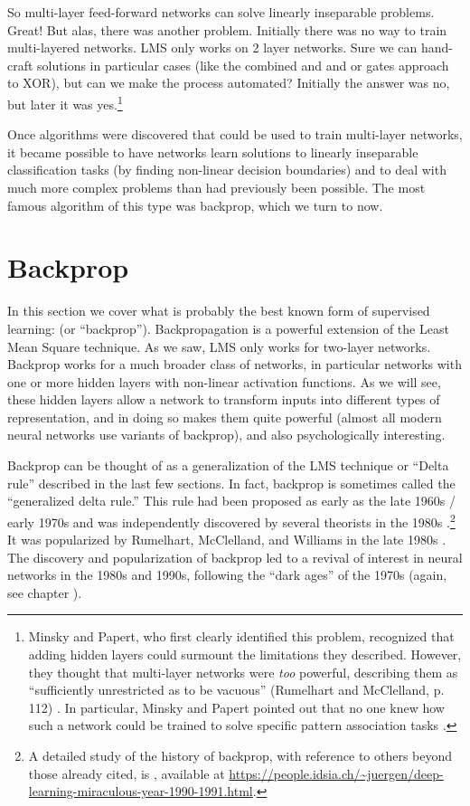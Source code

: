 So multi-layer feed-forward networks can solve linearly inseparable problems. Great!  But alas, there was another problem. Initially there was no way to train multi-layered networks. LMS only works on 2 layer networks. Sure we can hand-craft solutions in particular cases (like the combined and and or gates approach to XOR), but can we make the process automated? Initially the answer was no, but later it was yes.\footnote{Minsky and Papert, who first clearly identified this problem, recognized that adding hidden layers could surmount the limitations they described. However, they thought that multi-layer networks were {\em too} powerful, describing them as ``sufficiently unrestricted as to be vacuous'' (Rumelhart and McClelland, p. 112) \cite{rumelhart1986parallel}. In particular, Minsky and Papert pointed out that no one knew how such a network could be trained to solve specific pattern association tasks \cite{minsky1969perceptrons}.}

Once algorithms were discovered that could be used to train multi-layer networks, it became possible to have networks learn solutions to linearly inseparable classification tasks (by finding non-linear decision boundaries) and to deal with much more complex problems than had previously been possible. The most famous algorithm of this type was backprop, which we turn to now.

\section{Backprop}\label{backprop}

In this section we cover what is probably the best known form of supervised learning:  (or ``backprop''). Backpropagation is a powerful extension of the Least Mean Square technique. As we saw, LMS only works for two-layer networks. Backprop works for a much broader class of networks, in particular networks with one or more hidden layers with non-linear activation functions. As we will see, these hidden layers allow a network to transform inputs into different types of representation, and in doing so makes them quite powerful (almost all modern neural networks use variants of backprop), and also psychologically interesting. 

Backprop can be thought of as a generalization of the LMS technique or ``Delta rule'' described in the last few sections. In fact, backprop is sometimes called the ``generalized delta rule.'' This rule had been proposed as early as the late 1960s / early 1970s \cite{bryson1969applied, werbos1974beyond} and was independently discovered by several theorists in the 1980s \cite{le1986learning, parker1985learning}.\footnote{A detailed study of the history of backprop, with reference to others beyond those already cited, is \cite{schmidhuber2020deep}, available at \url{https://people.idsia.ch/~juergen/deep-learning-miraculous-year-1990-1991.html}.} It was popularized by Rumelhart, McClelland, and Williams in the late 1980s \cite{rumelhart1986parallel}. The discovery and popularization of backprop led to a revival of interest in neural networks in the 1980s and 1990s, following the ``dark ages'' of the 1970s (again, see chapter ).

